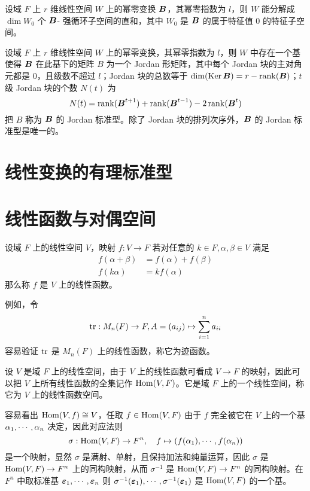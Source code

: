 \begin{theorem}
    设域 $F$ 上 $r$ 维线性空间 $W$ 上的幂零变换 $\boldsymbol{B}$，其幂零指数为 $l$，则 $W$ 能分解成 $\dim W_0$ 个 $\boldsymbol{B}$- 强循环子空间的直和，其中 $W_0$ 是 $\boldsymbol{B}$ 的属于特征值 $0$ 的特征子空间。
\end{theorem}

\begin{theorem}
    设域 $F$ 上 $r$ 维线性空间 $W$ 上的幂零变换，其幂零指数为 $l$，则 $W$ 中存在一个基使得 $\boldsymbol{B}$ 在此基下的矩阵 $B$ 为一个 Jordan 形矩阵，其中每个 Jordan 块的主对角元都是 $0$，且级数不超过 $l$；Jordan 块的总数等于 $\dim(\operatorname{Ker} \boldsymbol{B}) = r - \operatorname{rank}(\boldsymbol{B})$；$t$ 级 Jordan 块的个数 $N(t)$ 为
    \[ N(t) = \operatorname{rank}(\boldsymbol{B}^{t+1}) + \operatorname{rank}(\boldsymbol{B}^{t-1}) - 2 \operatorname{rank}(\boldsymbol{B}^t) \]
    把 $B$ 称为 $\boldsymbol{B}$ 的 Jordan 标准型。除了 Jordan 块的排列次序外，$\boldsymbol{B}$ 的 Jordan 标准型是唯一的。
\end{theorem}

\section{线性变换的有理标准型}

\section{线性函数与对偶空间}

\begin{definition}[线性函数]
    设域 $F$ 上的线性空间 $V$，映射 $f : V \to F$ 若对任意的 $k \in F, \alpha,\beta \in V$ 满足
    \begin{equation*}
        \begin{aligned}
            f(\alpha+\beta) & = f(\alpha) + f(\beta) \\
            f(k\alpha)      & = kf(\alpha)
        \end{aligned}
    \end{equation*}
    那么称 $f$ 是 $V$ 上的线性函数。
\end{definition}

例如，令
\[ \operatorname{tr} : M_n(F) \to F, A = (a_{ij}) \mapsto \sum_{i=1}^{n} a_{ii} \]
容易验证 $\operatorname{tr}$ 是 $M_n(F)$ 上的线性函数，称它为迹函数。

设 $V$ 是域 $F$ 上的线性空间，由于 $V$ 上的线性函数可看成 $V \to F$ 的映射，因此可以把 $V$ 上所有线性函数的全集记作 $\operatorname{Hom}(V,F)$。它是域 $F$ 上的一个线性空间，称它为 $V$ 上的线性函数空间。

容易看出 $\operatorname{Hom}(V,f) \cong V$，任取 $f \in \operatorname{Hom}(V,F)$ 由于 $f$ 完全被它在 $V$ 上的一个基 $\alpha_1,\cdots,\alpha_n$ 决定，因此对应法则
\[ \sigma : \operatorname{Hom}(V,F) \to F^n, \quad f \mapsto (f(\alpha_1),\cdots,f(\alpha_n)) \]
是一个映射，显然 $\sigma$ 是满射、单射，且保持加法和纯量运算，因此 $\sigma$ 是 $\operatorname{Hom}(V,F) \to F^n$ 上的同构映射，从而 $\sigma^{-1}$ 是 $\operatorname{Hom}(V,F) \to F^n$ 的同构映射。在 $F^n$ 中取标准基 $\boldsymbol{\varepsilon}_1,\cdots,\boldsymbol{\varepsilon}_n$ 则 $\sigma^{-1}(\boldsymbol{\varepsilon}_1),\cdots,\sigma^{-1}(\boldsymbol{\varepsilon}_1)$ 是 $\operatorname{Hom}(V,F)$ 的一个基。

